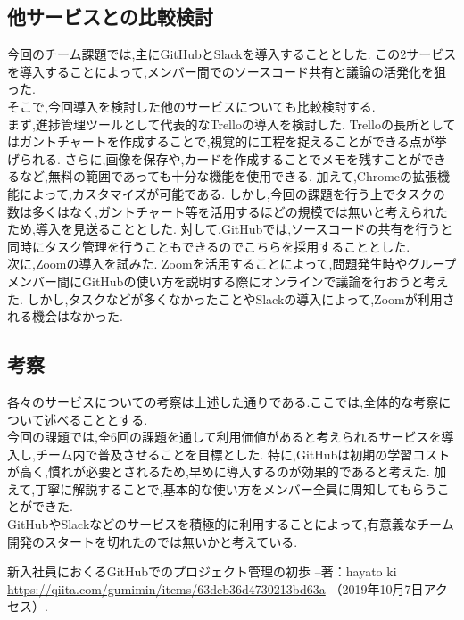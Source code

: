 ﻿\documentclass[uplatex,12pt]{jsarticle}
\begin{document}
\subsection{他サービスとの比較検討}
今回のチーム課題では,主にGitHubとSlackを導入することとした.
この2サービスを導入することによって,メンバー間でのソースコード共有と議論の活発化を狙った. \\
そこで,今回導入を検討した他のサービスについても比較検討する. \\
まず,進捗管理ツールとして代表的なTrelloの導入を検討した.
Trelloの長所としてはガントチャートを作成することで,視覚的に工程を捉えることができる点が挙げられる.
さらに,画像を保存や,カードを作成することでメモを残すことができるなど,無料の範囲であっても十分な機能を使用できる.
加えて,Chromeの拡張機能によって,カスタマイズが可能である.
しかし,今回の課題を行う上でタスクの数は多くはなく,ガントチャート等を活用するほどの規模では無いと考えられたため,導入を見送ることとした.
対して,GitHubでは,ソースコードの共有を行うと同時にタスク管理を行うこともできるのでこちらを採用することとした. \\
次に,Zoomの導入を試みた.
Zoomを活用することによって,問題発生時やグループメンバー間にGitHubの使い方を説明する際にオンラインで議論を行おうと考えた.
しかし,タスクなどが多くなかったことやSlackの導入によって,Zoomが利用される機会はなかった.

\subsection{考察}
各々のサービスについての考察は上述した通りである.ここでは,全体的な考察について述べることとする. \\
今回の課題では,全6回の課題を通して利用価値があると考えられるサービスを導入し,チーム内で普及させることを目標とした.
特に,GitHubは初期の学習コストが高く,慣れが必要とされるため,早めに導入するのが効果的であると考えた.
加えて,丁寧に解説することで,基本的な使い方をメンバー全員に周知してもらうことができた. \\
GitHubやSlackなどのサービスを積極的に利用することによって,有意義なチーム開発のスタートを切れたのでは無いかと考えている.


\begin{thebibliography}{99}
 新入社員におくるGitHubでのプロジェクト管理の初歩 --著：hayato ki \\
\url{https://qiita.com/gumimin/items/63dcb36d4730213bd63a} （2019年10月7日アクセス）.

\end{thebibliography}
\end{document}
